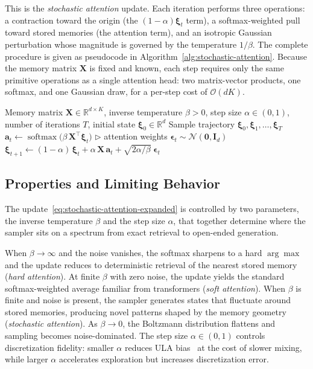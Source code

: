 This is the \emph{stochastic attention} update. Each iteration performs three operations: a contraction toward the origin (the $(1-\alpha)\boldsymbol{\xi}_t$ term), a softmax-weighted pull toward stored memories (the attention term), and an isotropic Gaussian perturbation whose magnitude is governed by the temperature $1/\beta$. The complete procedure is given as pseudocode in Algorithm~\ref{alg:stochastic-attention}. Because the memory matrix $\mathbf{X}$ is fixed and known, each step requires only the same primitive operations as a single attention head: two matrix-vector products, one softmax, and one Gaussian draw, for a per-step cost of $\mathcal{O}(dK)$.


\begin{algorithm}[t]
\caption{Stochastic Attention Sampler}\label{alg:stochastic-attention}
\begin{algorithmic}[1]
\REQUIRE Memory matrix $\mathbf{X}\in\mathbb{R}^{d\times K}$, inverse temperature $\beta>0$, step size $\alpha\in(0,1)$, number of iterations $T$, initial state $\boldsymbol{\xi}_0\in\mathbb{R}^d$
\ENSURE Sample trajectory $\boldsymbol{\xi}_0,\boldsymbol{\xi}_1,\dots,\boldsymbol{\xi}_T$
    \STATE $\mathbf{a}_t \leftarrow \operatorname{softmax}\!\bigl(\beta\,\mathbf{X}^{\top}\boldsymbol{\xi}_t\bigr)$ \hfill $\triangleright$ attention weights
    \STATE $\boldsymbol{\epsilon}_t \sim \mathcal{N}(\mathbf{0},\mathbf{I}_d)$
    \STATE $\boldsymbol{\xi}_{t+1} \leftarrow (1-\alpha)\,\boldsymbol{\xi}_t + \alpha\,\mathbf{X}\,\mathbf{a}_t + \sqrt{2\alpha/\beta}\;\boldsymbol{\epsilon}_t$
\ENDFOR
\end{algorithmic}
\end{algorithm}

\subsection{Properties and Limiting Behavior}
The update~\eqref{eq:stochastic-attention-expanded} is controlled by two parameters, the inverse temperature $\beta$ and the step size $\alpha$, that together determine where the sampler sits on a spectrum from exact retrieval to open-ended generation.

When $\beta\to\infty$ and the noise vanishes, the softmax sharpens to a hard $\arg\max$ and the update reduces to deterministic retrieval of the nearest stored memory (\emph{hard attention}). At finite $\beta$ with zero noise, the update yields the standard softmax-weighted average familiar from transformers (\emph{soft attention}). When $\beta$ is finite and noise is present, the sampler generates states that fluctuate around stored memories, producing novel patterns shaped by the memory geometry (\emph{stochastic attention}). As $\beta\to 0$, the Boltzmann distribution flattens and sampling becomes noise-dominated. The step size $\alpha\in(0,1)$ controls discretization fidelity: smaller $\alpha$ reduces ULA bias~\cite{durmusNonasymptoticAnalysisUnadjusted2017} at the cost of slower mixing, while larger $\alpha$ accelerates exploration but increases discretization error.

